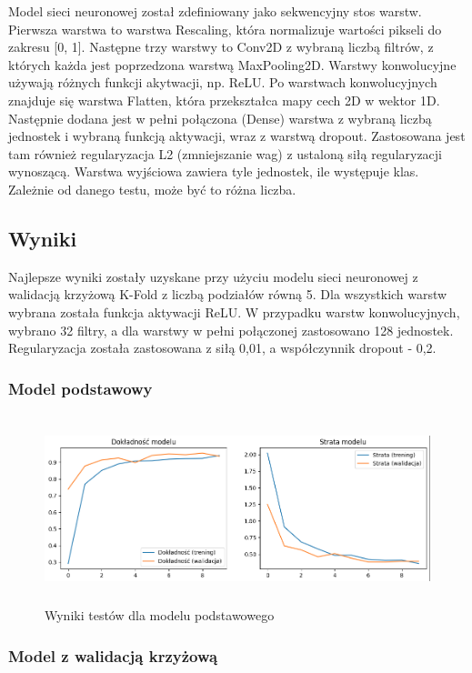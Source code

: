 Model sieci neuronowej został zdefiniowany jako sekwencyjny stos warstw.
Pierwsza warstwa to warstwa Rescaling, która normalizuje wartości pikseli do zakresu [0, 1].
Następne trzy warstwy to Conv2D z wybraną liczbą filtrów, z których każda jest poprzedzona warstwą MaxPooling2D.
Warstwy konwolucyjne używają różnych funkcji akytwacji, np. ReLU.
Po warstwach konwolucyjnych znajduje się warstwa Flatten, która przekształca mapy cech 2D w wektor 1D.
Następnie dodana jest w pełni połączona (Dense) warstwa z wybraną liczbą jednostek
i wybraną funkcją aktywacji, wraz z warstwą dropout.
Zastosowana jest tam również regularyzacja L2 (zmniejszanie wag) z ustaloną siłą regularyzacji wynoszącą.
Warstwa wyjściowa zawiera tyle jednostek, ile występuje klas.
Zależnie od danego testu, może być to różna liczba.

\subsection{Wyniki}
Najlepsze wyniki zostały uzyskane przy użyciu modelu sieci neuronowej z walidacją krzyżową K-Fold z liczbą podziałów równą 5.
Dla wszystkich warstw wybrana została funkcja aktywacji ReLU.
W przypadku warstw konwolucyjnych, wybrano 32 filtry, a dla warstwy w pełni połączonej zastosowano 128 jednostek.
Regularyzacja została zastosowana z siłą 0,01, a współczynnik dropout - 0,2.

\subsubsection{Model podstawowy}

\begin{figure}[ht]
	\centering
	\includegraphics[height=5.5cm]{partials/images/tests/v2.png}
	\caption{Wyniki testów dla modelu podstawowego}
\label{Fig:GraphUndirected}
\end{figure}
\FloatBarrier

\subsubsection{Model z walidacją krzyżową}

